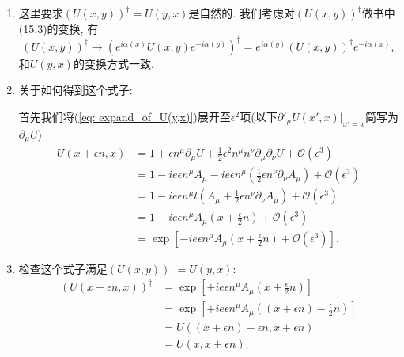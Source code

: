 \documentclass[10pt,b5paper,openany]{book}
\begin{document}
\begin{enumerate}
  \item 这里要求$(U(x,y))^{\dagger} = U(y,x)$是自然的. 我们考虑对$(U(x,y))^{\dagger}$做书中(15.3)的变换, 有
  \begin{equation}
    (U(x,y))^{\dagger} \rightarrow (e^{i\alpha(x)}U(x,y)e^{-i\alpha(y)})^{\dagger} = e^{i\alpha(y)}(U(x,y))^{\dagger}e^{-i\alpha(x)}, 
  \end{equation}
  和$U(y,x)$的变换方式一致. 
  
  \item 关于如何得到这个式子: 
  
  首先我们将(\ref{eq: expand_of_U(y,x)})展开至$\epsilon^2$项(以下$\partial'_{\mu}U(x', x)|_{x' = x}$简写为$\partial_{\mu}U$)
  \begin{equation}
    \begin{aligned}
      U(x+\epsilon n, x) &= 1 + \epsilon n^{\mu} \partial_{\mu}U + \tfrac{1}{2}\epsilon^2 n^{\mu} n^{\nu} \partial_{\mu} \partial_{\nu}U + \mathcal{O}(\epsilon^3) \\ 
      &= 1 - ie\epsilon n^{\mu}A_{\mu} - ie\epsilon n^{\mu} (\tfrac{1}{2} \epsilon n^{\nu} \partial_{\nu} A_{\mu}) + \mathcal{O}(\epsilon^3) \\
      &= 1 - ie\epsilon n^{\mu}l(A_{\mu} + \tfrac{1}{2} \epsilon n^{\nu} \partial_{\nu} A_{\mu}) + \mathcal{O}(\epsilon^3) \\ 
      &= 1 - ie\epsilon n^{\mu}A_{\mu}(x+\tfrac{\epsilon}{2}n) + \mathcal{O}(\epsilon^3) \\ 
      &= \exp[-ie\epsilon n^{\mu}A_{\mu}(x+\tfrac{\epsilon}{2}n) + \mathcal{O}(\epsilon^3)]. 
    \end{aligned}
  \end{equation}

  \item 检查这个式子满足$(U(x,y))^{\dagger} = U(y,x)$: 
  \begin{equation}
    \begin{aligned}
      (U(x+\epsilon n, x))^{\dagger} &= \exp[+ie\epsilon n^{\mu}A_{\mu}(x+\tfrac{\epsilon}{2}n)] \\
      &= \exp[+ie\epsilon n^{\mu}A_{\mu}((x+\epsilon n) - \tfrac{\epsilon}{2}n)] \\
      &= U((x+\epsilon n)-\epsilon n, x+\epsilon n) \\ 
      &= U(x, x+\epsilon n). 
    \end{aligned}
  \end{equation}
\end{enumerate}
\end{document}

